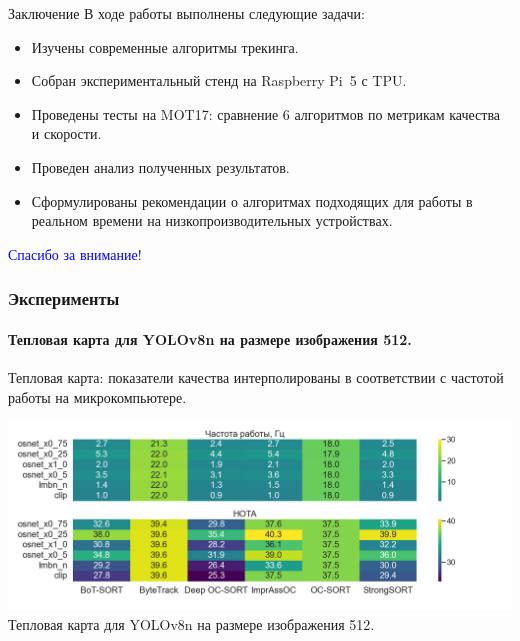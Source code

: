 \documentclass{beamer} %
\begin{document}
\begin{frame}{Заключение}
  В ходе работы выполнены следующие задачи:
  \begin{itemize}
    \item Изучены современные алгоритмы трекинга.
    \item Собран экспериментальный стенд на Raspberry Pi 5 с TPU.
    \item Проведены тесты на MOT17: сравнение 6 алгоритмов по метрикам качества и скорости.
    \item Проведен анализ полученных результатов.
    \item Сформулированы рекомендации о алгоритмах подходящих для работы в реальном времени на низкопроизводительных устройствах.
  \end{itemize}
\end{frame}


\begin{frame}
  \centering \Huge \textcolor{blue}{Спасибо за внимание!}
\end{frame}

\begin{frame}[noframenumbering]
  \frametitle{Эксперименты}
  \framesubtitle{Тепловая карта для YOLOv8n на размере изображения 512.}
  Тепловая карта: показатели качества интерполированы в соответствии с частотой работы на микрокомпьютере. 

  \centering
  \includegraphics[width=\linewidth]{images/plots/heatmap_fps_hota_vs_tracker_reid/heatmap_fps_hota_yolov8n_size512.png}\\
  \small Тепловая карта для YOLOv8n на размере изображения 512.
\end{frame}
\end{document}
